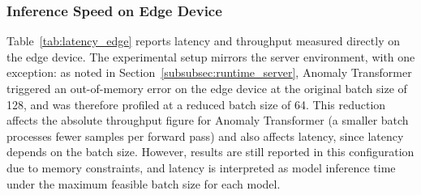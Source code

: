 \documentclass[twoside,11pt,openright]{report}
\begin{document}
\subsubsection{Inference Speed on Edge Device}
Table~\ref{tab:latency_edge} reports latency and throughput measured directly on the
edge device. The experimental setup mirrors the server environment, with one
exception: as noted in Section~\ref{subsubsec:runtime_server}, Anomaly Transformer
triggered an out-of-memory error on the edge device at the original batch size of
128, and was therefore profiled at a reduced batch size of 64.
This reduction affects the absolute throughput figure for Anomaly Transformer (a smaller 
batch processes fewer samples per forward pass) and also affects latency, since latency 
depends on the batch size. However, results are still reported in this configuration due 
to memory constraints, and latency is interpreted as model inference time under the maximum 
feasible batch size for each model.
\end{document}
